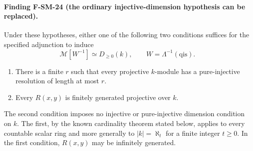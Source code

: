 \documentclass[11pt,a4paper]{article}
\theoremstyle{definition}\newtheorem{definition}[theorem]{Definition}
\theoremstyle{remark}\newtheorem{remark}[theorem]{Remark}
\begin{document}
\paragraph{Finding F-SM-24 (the ordinary injective-dimension hypothesis can be replaced).}
Under these hypotheses, either one of the following two conditions
suffices for the specified adjunction to induce
\[
 \mathcal M[W^{-1}]\simeq D_{\geq0}(k),
 \qquad W=\Lambda^{-1}(\mathrm{qis}).
 \tag{SM24.3}
\]
\begin{enumerate}
\item There is a finite $r$ such that every projective $k$-module
      has a pure-injective resolution of length at most $r$.
\item Every $R(x,y)$ is finitely generated projective over $k$.
\end{enumerate}
The second condition imposes no injective or pure-injective dimension
condition on $k$. The first, by the known cardinality theorem stated
below, applies to every countable scalar ring and more generally to
$|k|=\aleph_t$ for a finite integer $t\geq0$.
In the first condition, $R(x,y)$ may be infinitely generated.
\end{document}
